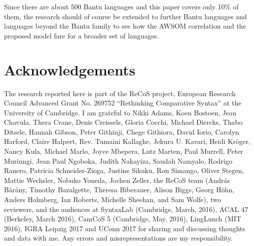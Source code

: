 \documentclass[output=paper
,modfonts
,nonflat]{langsci/langscibook}
\begin{document}
Since there are about 500 Bantu languages and this paper covers only 10\% of them, the research should of course be extended to further Bantu languages and languages beyond the Bantu family to see how the AWSOM correlation and the proposed model fare for a broader set of languages.

\section*{Acknowledgements}
The research reported here is part of the ReCoS project, European Research Council Advanced Grant No. 269752 ``Rethinking Comparative Syntax'' at the University of Cambridge. I am grateful to Nikki Adams, Koen Bostoen, Jean Chavula, Thera Crane, Denis Creissels, Gloria Cocchi, Michael Diercks, Thabo Ditsele, Hannah Gibson, Peter Githinji, Chege Githiora, David Iorio, Carolyn Harford, Claire Halpert, Rev. Tumaini Kallaghe, Jekura U. Kavari, Heidi Kröger, Nancy Kula, Michael Marlo, Joyce Mbepera, Lutz Marten, Paul Murrell, Peter Muriungi, Jean Paul Ngoboka, Judith Nakayiza, Saudah Namyalo, Rodrigo Ranero, Patricia Schneider-Zioga, Justine Sikuku, Ron Simango, Oliver Stegen, Mattie Wechsler, Nobuko Yoneda, Jochen Zeller, the ReCoS team (András Bárány, Timothy Bazalgette, Theresa Biberauer, Alison Biggs, Georg Höhn, Anders Holmberg, Ian Roberts, Michelle Sheehan, and Sam Wolfe), two reviewers, and the audiences at SyntaxLab (Cambridge, March, 2016), ACAL 47 (Berkeley, March 2016), CamCoS 5 (Cambridge, May, 2016), LingLunch (MIT 2016), IGRA Leipzig 2017 and UConn 2017 for sharing and discussing thoughts and data with me. Any errors and misrepresentations are my responsibility.
\end{document}
